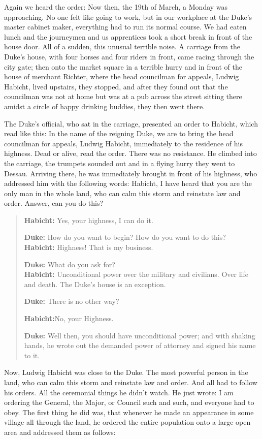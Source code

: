 Again we heard the order: Now then, the 19th of March, a Monday was approaching. No one felt like going to work, but in our workplace at the Duke's master cabinet maker, everything had to run its normal course. We had eaten lunch and the journeymen and us apprentices took a short break in front of the house door. All of a sudden, this unusual terrible noise. A carriage from the Duke's house, with four horses and four riders in front, came racing through the city gate; then onto the market square in a terrible hurry and in front of the house of merchant Richter, where the head councilman for appeals, Ludwig Habicht, lived upstairs, they stopped, and after they found out that the councilman was not at home but was at a pub across the street sitting there amidst a circle of happy drinking buddies, they then went there.

The Duke's official, who sat in the carriage, presented an order to Habicht, which read like this: In the name of the reigning Duke, we are to bring the head councilman for appeals, Ludwig Habicht, immediately to the residence of his highness. Dead or alive, read the order. There was no resistance. He climbed into the carriage, the trumpets sounded out and in a flying hurry they went to Dessau. Arriving there, he was immediately brought in front of his highness, who addressed him with the following words: Habicht, I have heard that you are the only man in the whole land, who can calm this storm and reinstate law and order. Answer, can you do this?

\begin{quote}
\textbf{Habicht:} Yes, your highness, I can do it.

\textbf{Duke:} How do you want to begin? How do you want to do this?\\
\textbf{Habicht:} Highness! That is my business.

\textbf{Duke:} What do you ask for?\\
\textbf{Habicht:} Unconditional power over the military and civilians. Over life and death. The Duke's house is an exception.

\textbf{Duke:} There is no other way?

\textbf{Habicht:}No, your Highness.

\textbf{Duke:} Well then, you should have unconditional power; and with shaking hands, he wrote out the demanded power of attorney and signed his name to it.
\end{quote}

Now, Ludwig Habicht was close to the Duke. The most powerful person in the land, who can calm this storm and reinstate law and order. And all had to follow his orders. All the ceremonial things he didn't watch. He just wrote: I am ordering the General, the Major, or Council such and such, and everyone had to obey. The first thing he did was, that whenever he made an appearance in some village all through the land, he ordered the entire population onto a large open area and addressed them as follows:

